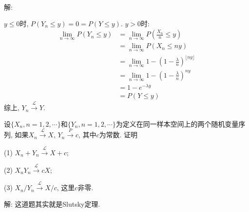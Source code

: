 \documentclass[standard]{ExBook}
\renewenvironment{shaded}{%
  \def\FrameCommand{\fboxsep=\FrameSep \colorbox{shadecolor}}%
  \MakeFramed{\advance\hsize-\width \FrameRestore}%
}{%
  \endMakeFramed
}
\begin{document}
\begin{qitems}
解: 

$y\leq 0$时, $P(Y_n \leq y)=0=P(Y\leq y)$. $y>0$时:
\begin{align*}
\lim\limits_{n\to \infty}P(Y_n \leq y) &= \lim\limits_{n\to \infty}P\left(\frac{X_n}{n} \leq y\right) \\
             &= \lim\limits_{n\to \infty}P(X_n \leq ny) \\
             &= \lim\limits_{n\to \infty} 1 - \left(1 - \frac{\lambda}{n}\right)^{\lfloor ny \rfloor}\\
             &= \lim\limits_{n\to \infty} 1 - \left(1 - \frac{\lambda}{n}\right)^{ny}\\
             &= 1 - e^{-\lambda y}\\
             &= P(Y \leq y)
\end{align*}
综上, $Y_n\xrightarrow{\mathcal{L}}Y$.

\vspace{2.5cm-5em}

    \begin{bbox}
    \begin{shaded}
        \qitem
设$\{X_n,n=1,2,\cdots\}$和$\{Y_n,n=1,2,\cdots\}$为定义在同一样本空间上的两个随机变量序列, 如果$X_n\xrightarrow{\mathcal{L}}X$, $Y_n\xrightarrow{P}c$, 其中$c$为常数. 证明

(1) $X_n+Y_n\xrightarrow{\mathcal{L}}X+c$;

(2) $X_n Y_n\xrightarrow{\mathcal{L}}cX$;

(3) $X_n/Y_n\xrightarrow{\mathcal{L}}X/c$, 这里$c$非零.
    \end{shaded}
    \end{bbox}

\vspace{\dimexpr2.5cm-5em\relax}

解: 这道题其实就是Slutsky定理.


\end{qitems}
\end{document}
